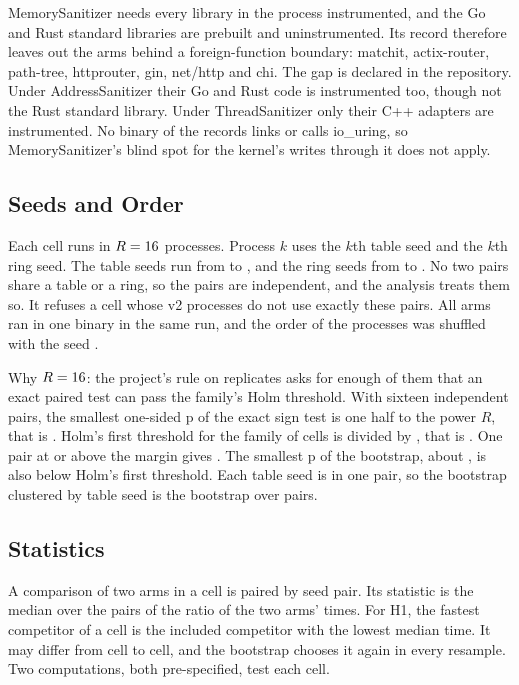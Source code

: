 MemorySanitizer needs every library in the process instrumented, and the Go and Rust standard
libraries are prebuilt and uninstrumented. Its record therefore leaves out the \MsanGapArms{} arms
behind a foreign-function boundary: matchit, actix-router, path-tree, httprouter, gin, net/http and
chi. The gap is declared in the repository. Under AddressSanitizer their Go and Rust code is
instrumented too, though not the Rust standard library. Under ThreadSanitizer only their C++
adapters are instrumented. No binary of the records links or calls io\_uring, so MemorySanitizer's blind
spot for the kernel's writes through it does not apply.

\subsection{Seeds and Order}\label{sec:seeds}

Each cell runs in $R=16$ processes. Process $k$ uses the $k$th table seed and the $k$th ring seed.
The table seeds run from \TableSeedFirst{} to \TableSeedLast{}, and the ring seeds from
\RingSeedFirst{} to \RingSeedLast. No two pairs share a table or a ring, so the pairs are
independent, and the analysis treats them so. It refuses a cell whose v2 processes do not use exactly
these pairs. All arms ran in one binary in the same run, and the order of the processes was shuffled
with the seed \RoundTwoOrderSeed.

Why $R=16$: the project's rule on replicates asks for enough of them that an exact paired
test can pass the family's Holm threshold. With sixteen independent pairs, the smallest one-sided p of the
exact sign test is one half to the power $R$, that is \SignMinP. Holm's first threshold for the family of \HOneCells{}
cells is \Alpha{} divided by \HOneCells, that is \HolmFirst. One pair at or above the margin gives
\SignOneAbove. The smallest p of the bootstrap, about \BootMinP, is also below Holm's first threshold.
Each table seed is in one pair, so the bootstrap clustered by table seed is the bootstrap over pairs.

\subsection{Statistics}\label{sec:stats}

A comparison of two arms in a cell is paired by seed pair. Its statistic is the median over the
\RoundTwoReps{} pairs of the ratio of the two arms' times. For H1, the fastest competitor of a cell is
the included competitor with the lowest median time. It may differ from cell to cell, and the
bootstrap chooses it again in every resample. Two computations, both pre-specified, test each cell.

